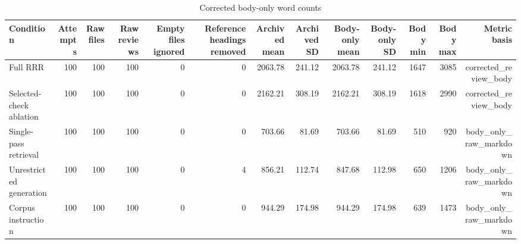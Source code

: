 \begin{table}[ht]
\centering
\caption{Corrected body-only word counts}
\scriptsize
\begin{tabular}{lrrrrrrrrrrrr}
\toprule
Condition & Attempts & Raw files & Raw reviews & Empty files ignored & Reference headings removed & Archived mean & Archived SD & Body-only mean & Body-only SD & Body min & Body max & Metric basis \\
\midrule
Full RRR & 100 & 100 & 100 & 0 & 0 & 2063.78 & 241.12 & 2063.78 & 241.12 & 1647 & 3085 & corrected\_review\_body \\
Selected-check ablation & 100 & 100 & 100 & 0 & 0 & 2162.21 & 308.19 & 2162.21 & 308.19 & 1618 & 2990 & corrected\_review\_body \\
Single-pass retrieval & 100 & 100 & 100 & 0 & 0 & 703.66 & 81.69 & 703.66 & 81.69 & 510 & 920 & body\_only\_raw\_markdown \\
Unrestricted generation & 100 & 100 & 100 & 0 & 4 & 856.21 & 112.74 & 847.68 & 112.98 & 650 & 1206 & body\_only\_raw\_markdown \\
Corpus instruction & 100 & 100 & 100 & 0 & 0 & 944.29 & 174.98 & 944.29 & 174.98 & 639 & 1473 & body\_only\_raw\_markdown \\
\bottomrule
\end{tabular}
\end{table}
